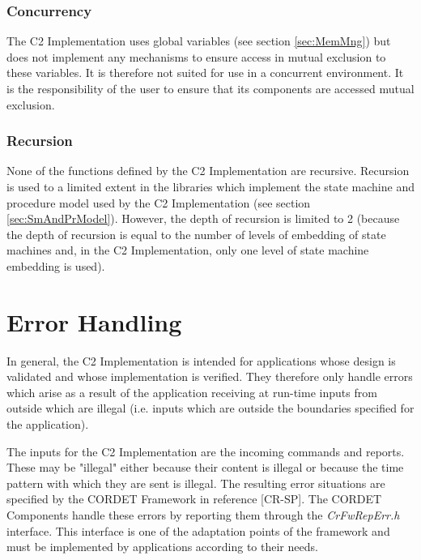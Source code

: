 \documentclass{pnp_article}
\begin{document}
\subsubsection{Concurrency}
The C2 Implementation uses global variables (see section \ref{sec:MemMng}) but does not implement any mechanisms to ensure access in mutual exclusion to these variables. It is therefore not suited for use in a concurrent environment. It is the responsibility of the user to ensure that its components are accessed mutual exclusion.

\subsubsection{Recursion}
None of the functions defined by the C2 Implementation are recursive. Recursion is used to a limited extent in the libraries which implement the state machine and procedure model used by the C2 Implementation (see section \ref{sec:SmAndPrModel}). However, the depth of recursion is limited to 2 (because the depth of recursion is equal to the number of levels of embedding of state machines and, in the C2 Implementation, only one level of state machine embedding is used).  


\section{Error Handling}\label{sec:ErrHandling}

In general, the C2 Implementation is intended for applications whose design is validated and whose implementation is verified. They therefore only handle errors which arise as a result of the application receiving at run-time inputs from outside which are illegal (i.e. inputs which are outside the boundaries specified for the application). 

The inputs for the C2 Implementation are the incoming commands and reports. These may be "illegal" either because their content is illegal or because the time pattern with which they are sent is illegal. The resulting error situations are specified by the CORDET Framework in reference [CR-SP]. The CORDET Components handle these errors by reporting them through the \textit{CrFwRepErr.h} interface. This interface is one of the adaptation points of the framework and must be implemented by applications according to their needs. 
\end{document}
